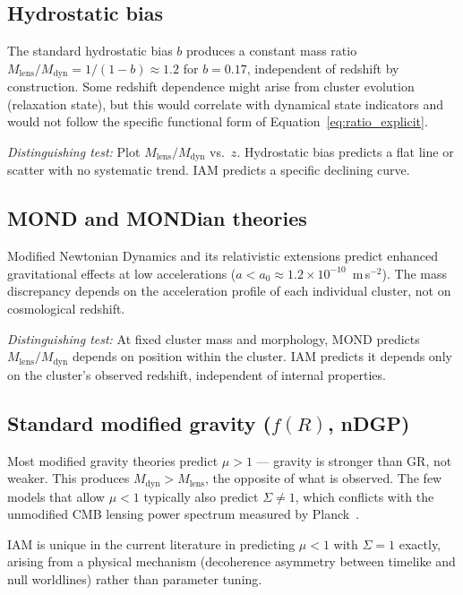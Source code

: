 \documentclass[12pt,a4paper]{article}
\begin{document}
\subsection{Hydrostatic bias}

The standard hydrostatic bias $b$ produces a constant mass ratio
$M_\mathrm{lens}/M_\mathrm{dyn} = 1/(1-b) \approx 1.2$ for $b = 0.17$,
independent of redshift by construction. Some redshift dependence might arise
from cluster evolution (relaxation state), but this would correlate with
dynamical state indicators and would not follow the specific functional form
of Equation~\ref{eq:ratio_explicit}.

\textit{Distinguishing test:} Plot $M_\mathrm{lens}/M_\mathrm{dyn}$ vs.\ $z$.
Hydrostatic bias predicts a flat line or scatter with no systematic trend. IAM
predicts a specific declining curve.

\subsection{MOND and MONDian theories}

Modified Newtonian Dynamics and its relativistic extensions predict enhanced
gravitational effects at low accelerations ($a < a_0 \approx 1.2\times
10^{-10}$~m\,s$^{-2}$). The mass discrepancy depends on the acceleration profile
of each individual cluster, not on cosmological redshift.

\textit{Distinguishing test:} At fixed cluster mass and morphology, MOND predicts
$M_\mathrm{lens}/M_\mathrm{dyn}$ depends on position within the cluster. IAM
predicts it depends only on the cluster's observed redshift, independent of
internal properties.

\subsection{Standard modified gravity ($f(R)$, nDGP)}

Most modified gravity theories predict $\mu > 1$ --- gravity is stronger than
GR, not weaker. This produces $M_\mathrm{dyn} > M_\mathrm{lens}$, the opposite
of what is observed. The few models that allow $\mu < 1$ typically also predict
$\Sigma \neq 1$, which conflicts with the unmodified CMB lensing power spectrum
measured by Planck~\citep{Planck2020lens}.

IAM is unique in the current literature in predicting $\mu < 1$ with $\Sigma = 1$
exactly, arising from a physical mechanism (decoherence asymmetry between
timelike and null worldlines) rather than parameter tuning.
\end{document}
